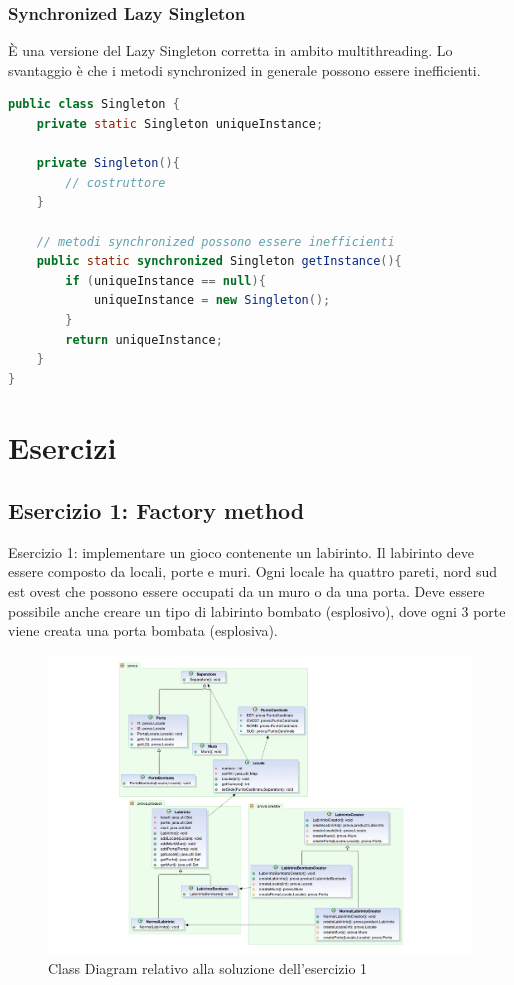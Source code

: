 \documentclass{article}
\begin{document}
\subsubsection{Synchronized Lazy Singleton}
\`E una versione del  Lazy Singleton corretta in ambito multithreading. Lo svantaggio \`e che i metodi synchronized in generale possono essere inefficienti.
\begin{lstlisting}[language=Java]
public class Singleton {
	private static Singleton uniqueInstance;
	
	private Singleton(){
		// costruttore
	}
	
	// metodi synchronized possono essere inefficienti
	public static synchronized Singleton getInstance(){
		if (uniqueInstance == null){
			uniqueInstance = new Singleton();
		}
		return uniqueInstance;
	}
}
\end{lstlisting}

\clearpage
\section{Esercizi}



\subsection{Esercizio 1: Factory method}
\begin{framed}
Esercizio 1: implementare un gioco contenente un labirinto. Il labirinto deve essere composto da locali, porte e muri. Ogni locale ha quattro pareti, nord sud est ovest che possono essere occupati da un muro o da una porta. Deve essere possibile anche creare un tipo di labirinto bombato (esplosivo), dove ogni 3 porte viene creata una porta bombata (esplosiva).
\end{framed}


\begin{figure}[h]
\includegraphics[width=1\textwidth]{Img/FactoryMethod.pdf}
\caption{Class Diagram relativo alla soluzione dell'esercizio 1}
\label{Fig:labirinto}
\end{figure}
\end{document}
